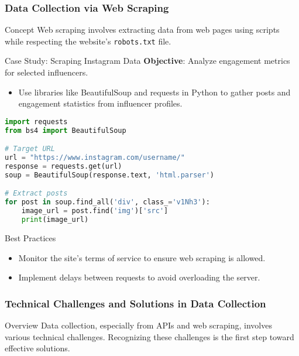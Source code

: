 \documentclass{beamer}
\begin{document}
\begin{frame}[fragile]
    \frametitle{Data Collection via Web Scraping}
    
    \begin{block}{Concept}
        Web scraping involves extracting data from web pages using scripts while respecting the website's \texttt{robots.txt} file.
    \end{block}
    
    \begin{block}{Case Study: Scraping Instagram Data}
        \textbf{Objective}: Analyze engagement metrics for selected influencers.
        \begin{itemize}
            \item Use libraries like BeautifulSoup and requests in Python to gather posts and engagement statistics from influencer profiles.
        \end{itemize}
    \end{block}
    
    \begin{lstlisting}[language=Python]
import requests
from bs4 import BeautifulSoup

# Target URL
url = "https://www.instagram.com/username/"
response = requests.get(url)
soup = BeautifulSoup(response.text, 'html.parser')

# Extract posts
for post in soup.find_all('div', class_='v1Nh3'):
    image_url = post.find('img')['src']
    print(image_url)
    \end{lstlisting}

    \begin{block}{Best Practices}
        \begin{itemize}
            \item Monitor the site’s terms of service to ensure web scraping is allowed.
            \item Implement delays between requests to avoid overloading the server.
        \end{itemize}
    \end{block}
\end{frame}

\begin{frame}[fragile]
    \frametitle{Technical Challenges and Solutions in Data Collection}
    \begin{block}{Overview}
        Data collection, especially from APIs and web scraping, involves various technical challenges.   
        Recognizing these challenges is the first step toward effective solutions.
    \end{block}
\end{frame}
\end{document}
